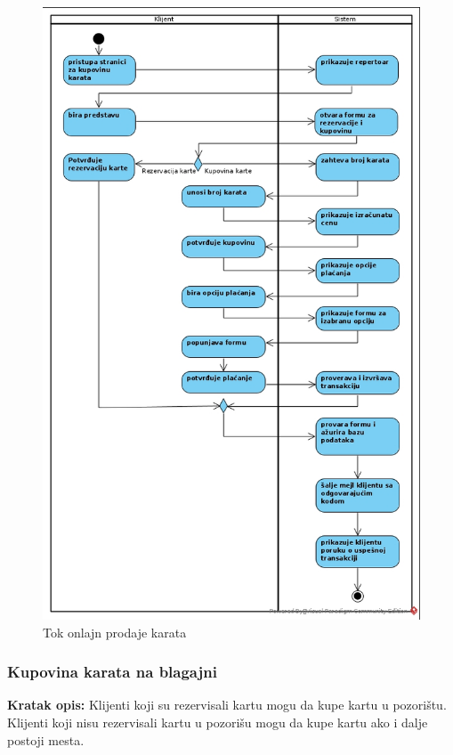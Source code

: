 \documentclass[a4paper]{article}
\begin{document}
        \newpage
        \begin{figure}[H]
          \begin{center}
              \includegraphics[width=120mm]{../images/activity_prodaja_karata.jpg}
          \end{center}
          \caption{Tok onlajn prodaje karata}
          \label{activity_prodaja_karata}
        \end{figure}

\subsubsection{Kupovina karata na blagajni}
\noindent\textbf{Kratak opis:} Klijenti koji su rezervisali kartu mogu da kupe kartu u pozorištu.
Klijenti koji nisu rezervisali kartu u pozorišu mogu da kupe kartu ako i dalje postoji mesta.\\
\end{document}
